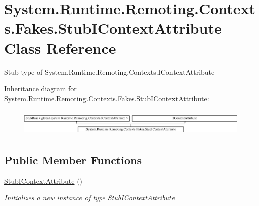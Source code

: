\hypertarget{class_system_1_1_runtime_1_1_remoting_1_1_contexts_1_1_fakes_1_1_stub_i_context_attribute}{\section{System.\-Runtime.\-Remoting.\-Contexts.\-Fakes.\-Stub\-I\-Context\-Attribute Class Reference}
\label{class_system_1_1_runtime_1_1_remoting_1_1_contexts_1_1_fakes_1_1_stub_i_context_attribute}
}


Stub type of System.\-Runtime.\-Remoting.\-Contexts.\-I\-Context\-Attribute 


Inheritance diagram for System.\-Runtime.\-Remoting.\-Contexts.\-Fakes.\-Stub\-I\-Context\-Attribute\-:\begin{figure}[H]
\begin{center}
\leavevmode
\includegraphics[height=1.314554cm]{class_system_1_1_runtime_1_1_remoting_1_1_contexts_1_1_fakes_1_1_stub_i_context_attribute}
\end{center}
\end{figure}
\subsection*{Public Member Functions}
\begin{DoxyCompactItemize}
\item 
\hyperlink{class_system_1_1_runtime_1_1_remoting_1_1_contexts_1_1_fakes_1_1_stub_i_context_attribute_ac0047370b4b3231f5392f19ddf9a0a05}{Stub\-I\-Context\-Attribute} ()
\begin{DoxyCompactList}\small\item\em Initializes a new instance of type \hyperlink{class_system_1_1_runtime_1_1_remoting_1_1_contexts_1_1_fakes_1_1_stub_i_context_attribute}{Stub\-I\-Context\-Attribute}\end{DoxyCompactList}\end{DoxyCompactItemize}
